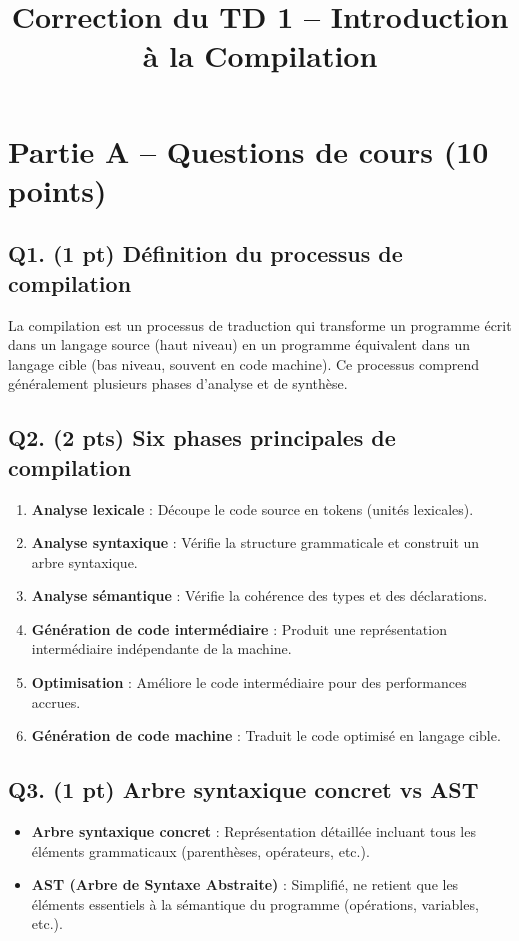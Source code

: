 \documentclass[12pt]{article}
\title{Correction du TD 1 – Introduction à la Compilation}
\author{}
\date{}
\begin{document}
\maketitle

\section*{Partie A – Questions de cours (10 points)}

\subsection*{Q1. (1 pt) Définition du processus de compilation}
La compilation est un processus de traduction qui transforme un programme écrit dans un langage source (haut niveau) en un programme équivalent dans un langage cible (bas niveau, souvent en code machine). Ce processus comprend généralement plusieurs phases d'analyse et de synthèse.

\subsection*{Q2. (2 pts) Six phases principales de compilation}
\begin{enumerate}
    \item \textbf{Analyse lexicale} : Découpe le code source en tokens (unités lexicales).
    \item \textbf{Analyse syntaxique} : Vérifie la structure grammaticale et construit un arbre syntaxique.
    \item \textbf{Analyse sémantique} : Vérifie la cohérence des types et des déclarations.
    \item \textbf{Génération de code intermédiaire} : Produit une représentation intermédiaire indépendante de la machine.
    \item \textbf{Optimisation} : Améliore le code intermédiaire pour des performances accrues.
    \item \textbf{Génération de code machine} : Traduit le code optimisé en langage cible.
\end{enumerate}

\subsection*{Q3. (1 pt) Arbre syntaxique concret vs AST}
\begin{itemize}
    \item \textbf{Arbre syntaxique concret} : Représentation détaillée incluant tous les éléments grammaticaux (parenthèses, opérateurs, etc.).
    \item \textbf{AST (Arbre de Syntaxe Abstraite)} : Simplifié, ne retient que les éléments essentiels à la sémantique du programme (opérations, variables, etc.).
\end{itemize}
\end{document}

